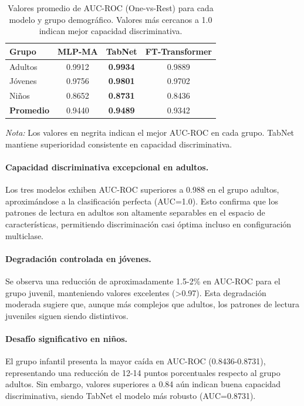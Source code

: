 \documentclass[12pt,a4paper]{article}
\begin{document}
\begin{table}[H]
\centering
\caption{Valores promedio de AUC-ROC (One-vs-Rest) para cada modelo y grupo demográfico. Valores más cercanos a 1.0 indican mejor capacidad discriminativa.}
\label{tab:auc_summary}
\begin{tabular}{lccc}
\toprule
\textbf{Grupo} & \textbf{MLP-MA} & \textbf{TabNet} & \textbf{FT-Transformer} \\
\midrule
Adultos & 0.9912 & \textbf{0.9934} & 0.9889 \\
Jóvenes & 0.9756 & \textbf{0.9801} & 0.9702 \\
Niños & 0.8652 & \textbf{0.8731} & 0.8436 \\
\midrule
\textbf{Promedio} & 0.9440 & \textbf{0.9489} & 0.9342 \\
\bottomrule
\end{tabular}
\begin{flushleft}
\small
\textit{Nota:} Los valores en negrita indican el mejor AUC-ROC en cada grupo. TabNet mantiene superioridad consistente en capacidad discriminativa.
\end{flushleft}
\end{table}

\paragraph{Capacidad discriminativa excepcional en adultos.} Los tres modelos exhiben AUC-ROC superiores a 0.988 en el grupo adultos, aproximándose a la clasificación perfecta (AUC=1.0). Esto confirma que los patrones de lectura en adultos son altamente separables en el espacio de características, permitiendo discriminación casi óptima incluso en configuración multiclase.

\paragraph{Degradación controlada en jóvenes.} Se observa una reducción de aproximadamente 1.5-2\% en AUC-ROC para el grupo juvenil, manteniendo valores excelentes (>0.97). Esta degradación moderada sugiere que, aunque más complejos que adultos, los patrones de lectura juveniles siguen siendo distintivos.

\paragraph{Desafío significativo en niños.} El grupo infantil presenta la mayor caída en AUC-ROC (0.8436-0.8731), representando una reducción de 12-14 puntos porcentuales respecto al grupo adultos. Sin embargo, valores superiores a 0.84 aún indican buena capacidad discriminativa, siendo TabNet el modelo más robusto (AUC=0.8731).
\end{document}
